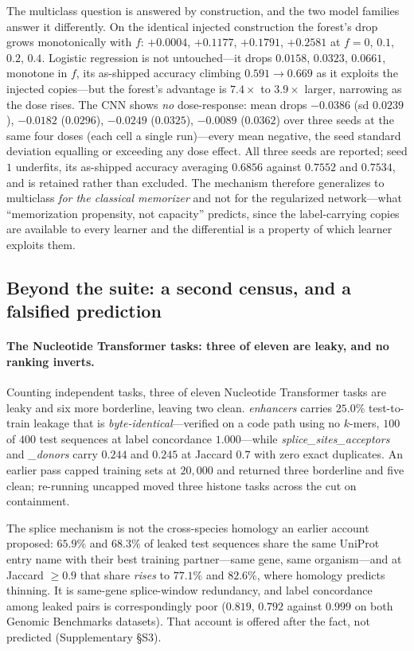 \documentclass[webpdf,modern,large,namedate]{oup-authoring-template}%
\begin{document}
The multiclass question is answered by construction, and the two model families answer it differently. On the identical injected construction the forest's drop grows monotonically with $f$: $+0.0004$, $+0.1177$, $+0.1791$, $+0.2581$ at $f=0$, $0.1$, $0.2$, $0.4$. Logistic regression is not untouched---it drops $0.0158$, $0.0323$, $0.0661$, monotone in $f$, its as-shipped accuracy climbing $0.591\to0.669$ as it exploits the injected copies---but the forest's advantage is $7.4\times$ to $3.9\times$ larger, narrowing as the dose rises. The CNN shows \emph{no} dose-response: mean drops $-0.0386$ (sd $0.0239$), $-0.0182$ ($0.0296$), $-0.0249$ ($0.0325$), $-0.0089$ ($0.0362$) over three seeds at the same four doses (each cell a single run)---every mean negative, the seed standard deviation equalling or exceeding any dose effect. All three seeds are reported; seed $1$ underfits, its as-shipped accuracy averaging $0.6856$ against $0.7552$ and $0.7534$, and is retained rather than excluded. The mechanism therefore generalizes to multiclass \emph{for the classical memorizer} and not for the regularized network---what ``memorization propensity, not capacity'' predicts, since the label-carrying copies are available to every learner and the differential is a property of which learner exploits them.

\subsection{Beyond the suite: a second census, and a falsified prediction}\label{sec:r-census}
\paragraph{The Nucleotide Transformer tasks: three of eleven are leaky, and no ranking inverts.} Counting independent tasks, three of eleven Nucleotide Transformer tasks are leaky and six more borderline, leaving two clean. \textit{enhancers} carries $25.0\%$ test-to-train leakage that is \emph{byte-identical}---verified on a code path using no $k$-mers, $100$ of $400$ test sequences at label concordance $1.000$---while \textit{splice\_sites\_acceptors} and \textit{\_donors} carry $0.244$ and $0.245$ at Jaccard $0.7$ with zero exact duplicates. An earlier pass capped training sets at $20{,}000$ and returned three borderline and five clean; re-running uncapped moved three histone tasks across the cut on containment.

The splice mechanism is not the cross-species homology an earlier account proposed: $65.9\%$ and $68.3\%$ of leaked test sequences share the same UniProt entry name with their best training partner---same gene, same organism---and at Jaccard $\ge0.9$ that share \emph{rises} to $77.1\%$ and $82.6\%$, where homology predicts thinning. It is same-gene splice-window redundancy, and label concordance among leaked pairs is correspondingly poor ($0.819$, $0.792$ against $0.999$ on both Genomic Benchmarks datasets). That account is offered after the fact, not predicted (Supplementary \S S3).
\end{document}
